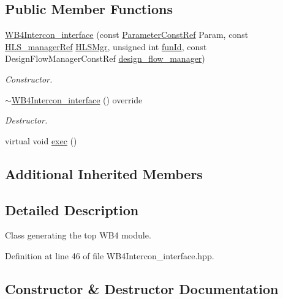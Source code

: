 \subsection*{Public Member Functions}
\begin{DoxyCompactItemize}
\item 
\hyperlink{classWB4Intercon__interface_a96bae582bff7598c0d99d4851b8ec97c}{W\+B4\+Intercon\+\_\+interface} (const \hyperlink{Parameter_8hpp_a37841774a6fcb479b597fdf8955eb4ea}{Parameter\+Const\+Ref} Param, const \hyperlink{hls__manager_8hpp_acd3842b8589fe52c08fc0b2fcc813bfe}{H\+L\+S\+\_\+manager\+Ref} \hyperlink{classHLS__step_ade85003a99d34134418451ddc46a18e9}{H\+L\+S\+Mgr}, unsigned int \hyperlink{classHLSFunctionStep_a3e6434fd86c698b0c70520b859bff5b0}{fun\+Id}, const Design\+Flow\+Manager\+Const\+Ref \hyperlink{classDesignFlowStep_ab770677ddf087613add30024e16a5554}{design\+\_\+flow\+\_\+manager})
\begin{DoxyCompactList}\small\item\em Constructor. \end{DoxyCompactList}\item 
\hyperlink{classWB4Intercon__interface_a474d261542b25f923f4cbfac6a74e074}{$\sim$\+W\+B4\+Intercon\+\_\+interface} () override
\begin{DoxyCompactList}\small\item\em Destructor. \end{DoxyCompactList}\item 
virtual void \hyperlink{classWB4Intercon__interface_a3e1e0b77dcc355b24a19bfe32de05610}{exec} ()
\end{DoxyCompactItemize}
\subsection*{Additional Inherited Members}


\subsection{Detailed Description}
Class generating the top W\+B4 module. 

Definition at line 46 of file W\+B4\+Intercon\+\_\+interface.\+hpp.



\subsection{Constructor \& Destructor Documentation}
\mbox{\label{classWB4Intercon__interface_a96bae582bff7598c0d99d4851b8ec97c}} 
